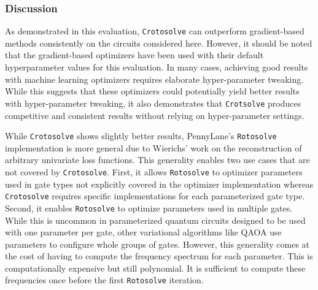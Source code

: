 \subsubsection*{Discussion}

As demonstrated in this evaluation, \texttt{Crotosolve} can outperform
gradient-based methods consistently on the circuits considered here.
However, it should be noted that the gradient-based optimizers have been used
with their default hyperparameter values for this evaluation.
In many cases, achieving good results with machine learning optimizers requires
elaborate hyper-parameter tweaking.
While this suggests that these optimizers could potentially yield better results
with hyper-parameter tweaking, it also demonstrates that \texttt{Crotsolve}
produces competitive and consistent results without relying on hyper-parameter
settings.

While \texttt{Crotosolve} shows slightly better results, PennyLane's
\texttt{Rotosolve} implementation is more general due to Wierichs' work on the
reconstruction of arbitrary univariate loss functions.
This generality enables two use cases that are not covered by \texttt{Crotosolve}.
First, it allows \texttt{Rotosolve} to optimizer parameters used in gate types
not explicitly covered in the optimizer implementation whereas
\texttt{Crotosolve} requires specific implementations for each parameterized
gate type.
Second, it enables \texttt{Rotosolve} to optimize parameters used in multiple
gates.
While this is uncommon in parameterized quantum circuits designed to be used
with one parameter per gate, other variational algorithms like QAOA use
parameters to configure whole groups of gates.
However, this generality comes at the cost of having to compute the frequency
spectrum for each parameter.
This is computationally expensive but still polynomial.
It is sufficient to compute these frequencies once before the first
\texttt{Rotosolve} iteration.
